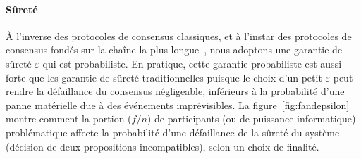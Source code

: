 \documentclass[letterpaper,twocolumn,10pt]{article}
\theoremstyle{definition}
\begin{document}
\paragraph{Sûreté} À l'inverse des protocoles de consensus classiques, et à l'instar des protocoles de consensus fondés sur la chaîne la plus longue~\cite{nakamoto2008bitcoin}, nous adoptons une garantie de sûreté-$\varepsilon$ qui est probabiliste.
En pratique, cette garantie probabiliste est aussi forte que les garantie de sûreté traditionnelles puisque le choix d'un petit $\varepsilon$ peut rendre la défaillance du consensus négligeable, inférieurs à la probabilité d'une panne matérielle due à des événements imprévisibles.
La figure~\ref{fig:fandepsilon} montre comment la portion ($f/n$) de participants (ou de puissance informatique) problématique affecte la probabilité d'une défaillance de la sûreté du système (décision de deux propositions incompatibles), selon un choix de finalité.
\end{document}
